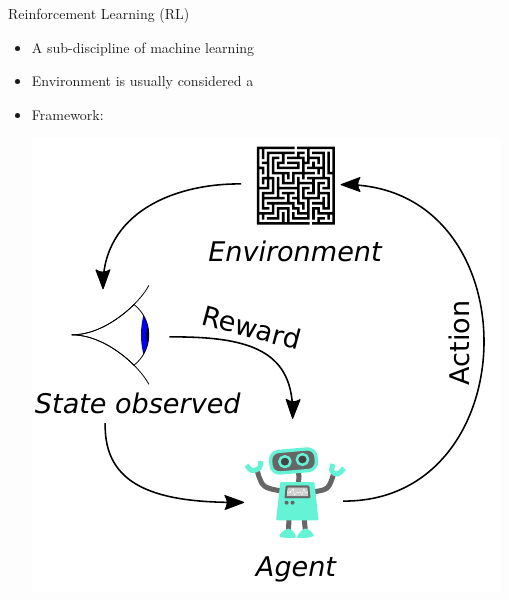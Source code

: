\documentclass[aspectratio=1610]{beamer}
\renewcommand{\footnotesize}{\scriptsize}
\begin{document}


\begin{frame}{Reinforcement Learning (RL)}
	\begin{itemize}
		\item A sub-discipline of machine learning
		\item Environment is usually considered a 
		\item Framework:\\
		\begin{minipage}[c]{0.45\textwidth}
			\includegraphics[width=\linewidth]{graphics/reinforcement_learning}
		\end{minipage} \hfill
		\begin{minipage}[c]{0.20\textwidth}

\end{minipage}
\end{itemize}
\end{frame}
\end{document}
